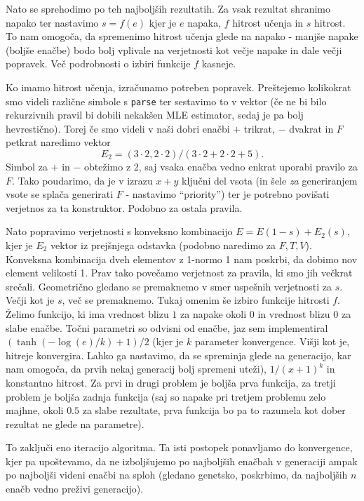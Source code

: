 \documentclass{article}
\begin{document}
Nato se sprehodimo po teh najboljših rezultatih. Za vsak rezultat shranimo napako ter nastavimo \(s=f(e)\) kjer je \(e\) napaka, \(f\) hitrost učenja in \(s\) hitrost. To nam omogoča, da spremenimo hitrost učenja glede na napako - manjše napake (boljše enačbe) bodo bolj vplivale na verjetnosti kot večje napake in dale večji popravek. Več podrobnosti o izbiri funkcije \(f\) kasneje. 

Ko imamo hitrost učenja, izračunamo potreben popravek. Preštejemo kolikokrat smo videli različne simbole s \texttt{parse} ter sestavimo to v vektor  (če ne bi bilo rekurzivnih pravil bi dobili nekakšen MLE estimator, sedaj je pa bolj hevrestično). Torej če smo videli v naši dobri enačbi \(+\) trikrat, \(-\) dvakrat in \(F\) petkrat naredimo vektor 
\[
    E_2=(3\cdot 2, 2\cdot2)/(3\cdot 2+2\cdot 2 + 5).
\]
Simbol za \(+\) in \(-\) obtežimo z 2, saj vsaka enačba vedno enkrat uporabi pravilo za \(F\). Tako poudarimo, da je v izrazu \(x+y\) ključni del vsota (in šele \emph{za} generiranjem vsote se splača generirati \(F\) - nastavimo ``priority'') ter je potrebno povišati verjetnos za ta konstruktor. Podobno za ostala pravila.

Nato popravimo verjetnosti s konveksno kombinacijo \(E = E(1-s) + E_2(s)\), kjer je \(E_2\) vektor iz prejšnjega odstavka (podobno naredimo za \(F,T,V\)). Konveksna kombinacija dveh elementov z 1-normo 1 nam poskrbi, da dobimo nov element velikosti 1. Prav tako povečamo verjetnost za pravila, ki smo jih večkrat srečali. Geometrično gledano se premaknemo v smer uspešnih verjetnosti za \(s\). Večji kot je \(s\), več se premaknemo. Tukaj omenim še izbiro funkcije hitrosti \(f\). Želimo funkcijo, ki ima vrednost blizu \(1\) za napake okoli \(0\) in vrednost blizu \(0\) za slabe enačbe. Točni parametri so odvisni od enačbe, jaz sem implementiral \((\tanh(-\log(e)/k)+1)/2\) (kjer je \(k\) parameter konvergence. Višji kot je, hitreje konvergira. Lahko ga nastavimo, da se spreminja glede na generacijo, kar nam omogoča, da prvih nekaj generacij bolj spremeni uteži), \(1/(x+1)^k\) in konstantno hitrost. Za prvi in drugi problem je boljša prva funkcija, za tretji problem je boljša zadnja funkcija (saj so napake pri tretjem problemu zelo majhne, okoli \(0.5\) za slabe rezultate, prva funkcija bo pa to razumela kot dober rezultat ne glede na parametre).

To zaključi eno iteracijo algoritma. Ta isti postopek ponavljamo do konvergence, kjer pa upoštevamo, da ne izboljšujemo po najboljših enačbah v generaciji ampak po najboljši videni enačbi na sploh (gledano genetsko, poskrbimo, da najboljših \(n\) enačb vedno preživi generacijo).
\end{document}
